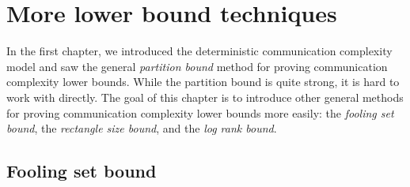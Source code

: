 






% 

\chapter[More lower bound techniques]{More lower bound techniques}
In the first chapter, we introduced the deterministic communication complexity 
model and saw the general \emph{partition bound} method for proving communication complexity lower bounds. While the partition bound is quite strong, it is hard to work with directly. The goal of this chapter is to introduce other general methods for proving communication complexity lower bounds more easily: the \emph{fooling set bound}, the \emph{rectangle size bound}, and the \emph{log rank bound}.



\newpage \section{Fooling set bound}

